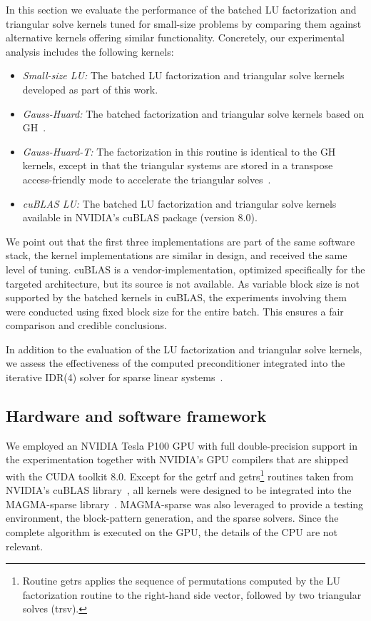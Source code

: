 In this section we evaluate the performance of the batched LU factorization and triangular solve kernels tuned for small-size
problems
by comparing them
against alternative kernels offering similar functionality.
Concretely, our experimental analysis includes the following kernels:
\begin{itemize}
\item
\textit{Small-size LU:}
The batched LU factorization and triangular solve kernels developed as part of this work.
\item
\textit{Gauss-Huard:}
The batched factorization and triangular solve kernels based on GH~\cite{gh}.
\item
\textit{Gauss-Huard-T:}
The factorization in this routine is identical to the GH kernels, 
except in that the triangular systems are stored in a transpose access-friendly mode to
accelerate the triangular solves~\cite{gh}.
\item
\textit{cuBLAS LU:}
The batched LU factorization and triangular solve kernels available in NVIDIA's cuBLAS package (version 8.0).
\end{itemize}
We point out that the first three implementations
are part of the same software stack,
the kernel implementations are similar in design,
and received the same level of tuning.
cuBLAS is a vendor-implementation,
optimized specifically for the targeted architecture,
but its source is not available.
As variable block size is not supported by the batched kernels in cuBLAS,
the experiments involving them were conducted using
fixed block size for the entire batch.
This ensures a fair comparison and credible conclusions.

In addition to the evaluation of the LU factorization and triangular solve kernels, 
we assess the effectiveness of the computed preconditioner
integrated into the iterative IDR(4) solver for sparse linear systems~\cite{saad}.

\subsection{Hardware and software framework}
We employed an NVIDIA Tesla P100 GPU with full double-precision support in the experimentation
together with NVIDIA's GPU compilers that are shipped with the CUDA toolkit 8.0. 
Except for the {\sc getrf} and {\sc getrs}\footnote{Routine {\sc getrs} applies the sequence of permutations computed
by the LU factorization routine to the right-hand side vector, followed by two
triangular solves ({\sc trsv}).} 
routines taken from NVIDIA's cuBLAS library~\cite{cuda8.0}, 
all kernels
were designed to be integrated into the MAGMA-sparse library~\cite{magma}.
MAGMA-sparse was also leveraged to provide a testing environment, the block-pattern generation, and the sparse solvers.
Since the complete algorithm is executed on the GPU, the details of the CPU are
not relevant.

